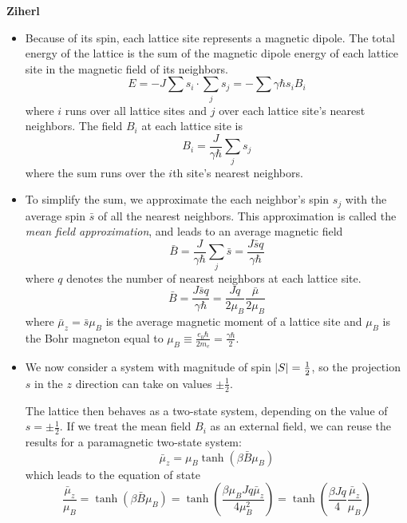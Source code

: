 \documentclass[11pt, a4paper]{article}
\begin{document}
\iffalse
\textbf{Ziherl}
\begin{itemize}	
	\item Because of its spin, each lattice site represents a magnetic dipole. The total energy of the lattice is the sum of the magnetic dipole energy of each lattice site in the magnetic field of its neighbors. 
	\begin{equation*}
		E = - J \sum s_{i} \cdot \sum_{j} s_{j} = - \sum \gamma \hbar s_{i} B_{i}
	\end{equation*}
	where $ i $ runs over all lattice sites and $ j $ over each lattice site's nearest neighbors. The field $ B_{i} $ at each lattice site is
	\begin{equation*}
		B_{i} = \frac{J}{\gamma \hbar}\sum_{j} s_{j}
	\end{equation*}
	where the sum runs over the $ i $th site's nearest neighbors.
	
	\item To simplify the sum, we approximate the each neighbor's spin $ s_{j} $ with the average spin $ \bar{s} $ of all the nearest neighbors. This approximation is called the \textit{mean field approximation}, and leads to an average magnetic field
	\begin{equation*}
		\bar{B} = \frac{J}{\gamma \hbar}\sum_{j} \bar{s} = \frac{J \bar{s} q}{\gamma \hbar}
	\end{equation*}
	where $ q $ denotes the number of nearest neighbors at each lattice site. 
	\begin{equation*}
		\bar{B}  = \frac{J \bar{s} q}{\gamma \hbar} = \frac{J q}{2\mu_{B}} \frac{\bar{\mu}}{2\mu_{B}}
	\end{equation*}
	where $ \bar{\mu}_{z} = \bar{s} \mu_{B} $ is the average magnetic moment of a lattice site and $ \mu_{B}  $ is the Bohr magneton equal to $ \mu_{B} \equiv \frac{e_{0}\hbar}{2m_{e}} = \frac{\gamma \hbar}{2} $.
	
	\item We now consider a system with magnitude of spin $ \abs{S} = \frac{1}{2} $, so the projection $ s $ in the $ z $ direction can take on values $ \pm \frac{1}{2} $.
	
	The lattice then behaves as a two-state system, depending on the value of $ s = \pm \frac{1}{2} $. If we treat the mean field $ B_{i} $ as an external field, we can reuse the results for a paramagnetic two-state system:
	\begin{equation*}
		\bar{\mu}_{z} = \mu_{B}\tanh(\beta \bar{B} \mu_{B})
	\end{equation*}
	which leads to the equation of state
	\begin{equation*}
		\frac{\bar{\mu}_{z}}{\mu_{B}} = \tanh(\beta \bar{B}\mu_{B} ) = \tanh(\frac{\beta \mu_{B}J q \bar{\mu}_{z}}{4 \mu_{B}^{2}}) = \tanh(\frac{\beta J q }{4} \frac{\bar{\mu}_{z}}{\mu_{B}})
	\end{equation*}
	

\end{itemize}
\end{document}
